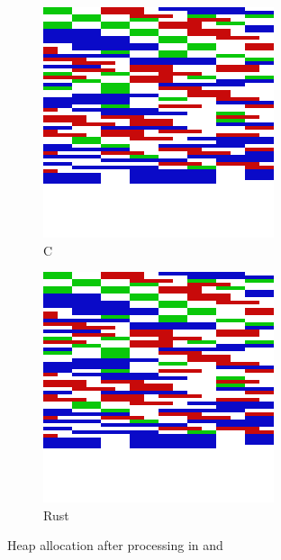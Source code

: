 \begin{figure}[H]

  \centering
  \begin{subfigure}{0.47\textwidth}
    \centering
    \includegraphics[scale=0.25]{results/plots/heap/cfrag}
    \caption{C}
    \label{fig:heap:frag:c}
  \end{subfigure}
  \hfill
  \begin{subfigure}{0.47\textwidth}
      \centering
    \includegraphics[scale=0.25]{results/plots/heap/rfrag}
    \caption{Rust}
    \label{fig:heap:frag:r}
  \end{subfigure}
  \caption{Heap allocation after processing in {\rust} and {\C}}
  \label{fig:heap:frag}

\end{figure}
